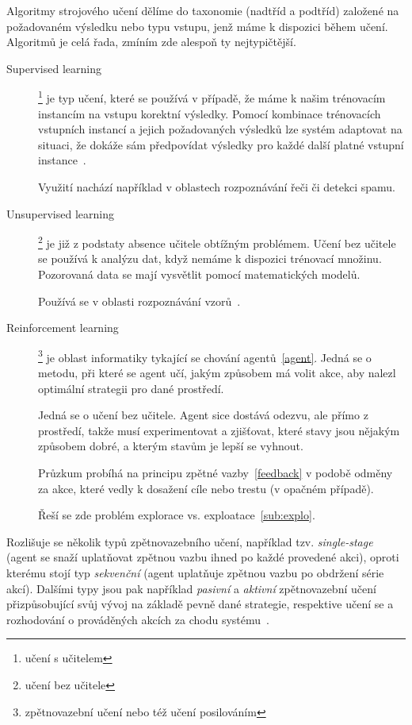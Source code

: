 \documentclass[thesis=M,czech]{FITthesis}[2014/05/07]
\begin{document}
Algoritmy strojového učení dělíme do taxonomie (nadtříd a podtříd) založené na požadovaném výsledku nebo typu vstupu, jenž máme k dispozici během učení. Algoritmů je celá řada, zmíním zde alespoň ty nejtypičtější. 

\begin{description}
  \item[Supervised learning]\footnote{učení s učitelem} je typ učení, které se používá v případě, že máme k našim trénovacím instancím na vstupu korektní výsledky. Pomocí kombinace trénovacích vstupních instancí a jejich požadovaných výsledků lze systém adaptovat na situaci, že dokáže sám předpovídat výsledky pro každé další platné vstupní instance~\cite{aihorizon}.
  
  Využití nachází například v oblastech rozpoznávání řeči či detekci spamu.
  \item[Unsupervised learning]\footnote{učení bez učitele} je již z podstaty absence učitele obtížným problémem. Učení bez učitele se používá k analýzu dat, když nemáme k dispozici trénovací množinu. Pozorovaná data se mají vysvětlit pomocí matematických modelů.
  
  Používá se v oblasti rozpoznávání vzorů~\cite{hlavac}.
  \item[Reinforcement learning]\footnote{zpětnovazební učení nebo též učení posilováním} je oblast informatiky tykající se chování agentů~\ref{agent}. Jedná se o metodu, při které se agent učí, jakým způsobem má volit akce, aby nalezl optimální strategii pro dané prostředí.
  
  Jedná se o učení bez učitele. Agent sice dostává odezvu, ale přímo z prostředí, takže musí experimentovat a zjišťovat, které stavy jsou nějakým způsobem dobré, a kterým stavům je lepší se vyhnout.
  
  Průzkum probíhá na principu zpětné vazby~\ref{feedback} v podobě odměny za akce, které vedly k dosažení cíle nebo trestu (v opačném případě).
  
  Řeší se zde problém explorace vs. exploatace~\ref{sub:explo}. 
\end{description}

Rozlišuje se několik typů zpětnovazebního učení, například tzv. \emph{single-stage} (agent se snaží uplatňovat zpětnou vazbu ihned po každé provedené akci), oproti kterému stojí typ \emph{sekvenční} (agent uplatňuje zpětnou vazbu po obdržení série akcí). Dalšími typy jsou pak například \emph{pasivní} a \emph{aktivní} zpětnovazební učení přizpůsobující svůj vývoj na základě pevně dané strategie, respektive učení se a rozhodování o prováděných akcích za chodu systému~\cite{reinforcement}.
\end{document}
